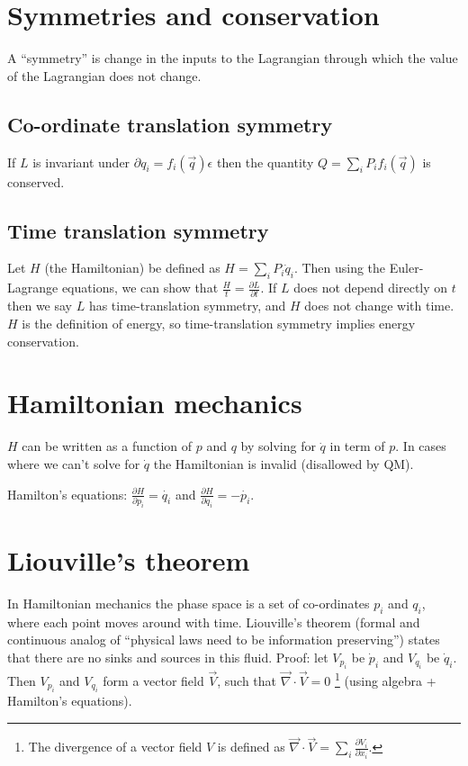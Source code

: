 \documentclass[12pt]{article}
\begin{document}
\section{Symmetries and conservation}

A ``symmetry'' is change in the inputs to the Lagrangian through which the value
of the Lagrangian does not change.

\subsection{Co-ordinate translation symmetry}

If $L$ is invariant under $\partial q_i = f_i(\overrightarrow{q}) \epsilon$ then
the quantity $Q = \sum_{i} P_{i} f_i(\overrightarrow{q})$ is conserved.

\subsection{Time translation symmetry}

Let $H$ (the Hamiltonian) be defined as $H = \sum_i P_i \dot{q}_i$.  Then using
the Euler-Lagrange equations, we can show that $\frac{H}{t} = \frac{\partial
  L}{\partial t}$.  If $L$ does not depend directly on $t$ then we say $L$ has
time-translation symmetry, and $H$ does not change with time.  $H$ is the
definition of energy, so time-translation symmetry implies energy conservation.

\section{Hamiltonian mechanics}

$H$ can be written as a function of $p$ and $q$ by solving for $\dot q$ in term
of $p$.  In cases where we can't solve for $\dot q$ the Hamiltonian is invalid
(disallowed by QM).

Hamilton's equations: $\frac{\partial H}{\partial p_i}=\dot{q_i}$ and
$\frac{\partial H}{\partial q_i}=-\dot{p_i}$.

\section{Liouville's theorem}

In Hamiltonian mechanics the phase space is a set of co-ordinates $p_i$ and
$q_i$, where each point moves around with time.  Liouville's theorem (formal and
continuous analog of ``physical laws need to be information preserving'') states
that there are no sinks and sources in this fluid.  Proof: let $V_{p_i}$ be
$\dot p_i$ and $V_{q_i}$ be $\dot q_i$.  Then $V_{p_i}$ and $V_{q_i}$ form a
vector field $\overrightarrow V$, such that $\overrightarrow{\nabla} \cdot
\overrightarrow{V} = 0$ \footnote{The divergence of a vector field $V$ is defined as
$\overrightarrow{\nabla} \cdot \overrightarrow{V} = \sum_i \frac{\partial
  V_i}{\partial x_i}$.} (using algebra + Hamilton's equations).
\end{document}
